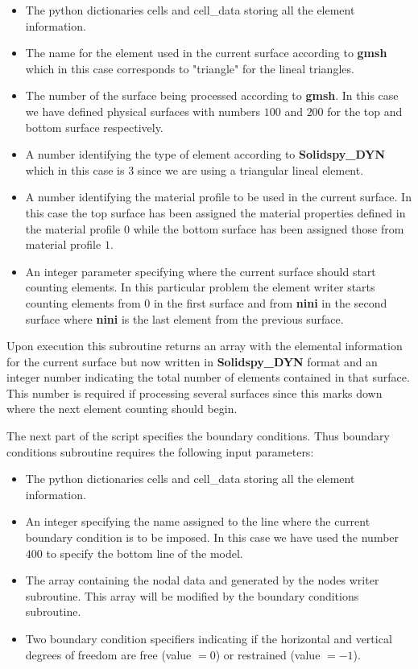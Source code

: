 \documentclass[11pt,letterpaper]{article}
\begin{document}
\begin{itemize}
\item  The python dictionaries cells and cell\_data storing all the element information.
\item  The name for the element used in the current surface according to {\bf gmsh} which in this case corresponds to "triangle" for the lineal triangles.
\item The number of the surface being processed according to {\bf gmsh}. In this case we have defined physical surfaces with numbers $100$ and $200$ for the top and bottom surface respectively.
\item A number identifying the type of element according to {\bf Solidspy\_DYN} which in this case is $3$ since we are using a triangular lineal element.
\item  A number identifying the material profile to be used in the current surface. In this case the top surface has been assigned the material properties defined in the material profile $0$ while the bottom surface has been assigned those from material profile $1$.
\item An integer parameter specifying where the current surface should start counting elements. In this particular problem the element writer starts counting elements from $0$ in the first surface and from {\bf nini} in the second surface where {\bf nini} is the last element from the previous surface.
\end{itemize}

Upon execution this subroutine returns an array with the elemental information for the current surface but now written in {\bf Solidspy\_DYN} format and an integer number indicating the total number of elements contained in that surface. This number is required if processing several surfaces since this marks down where the next element counting should begin.

The next part of the script specifies the boundary conditions. Thus boundary conditions subroutine requires the following input parameters:

\begin{itemize}
\item The python dictionaries cells and cell\_data storing all the element information.
\item An integer specifying the name assigned to the line where the current boundary condition is to be imposed. In this case we have used the number $400$ to specify the bottom line of the model.
\item The array containing the nodal data and generated by the nodes writer subroutine. This array will be modified by the boundary conditions subroutine.
\item Two boundary condition specifiers indicating if the horizontal and vertical degrees of freedom are free (value $=0$) or restrained (value $=-1$).
\end{itemize}
\end{document}
